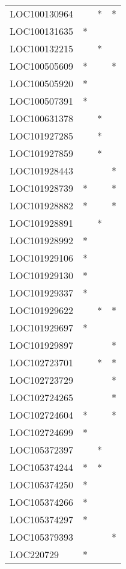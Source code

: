 \begin{longtable}{lccc}
LOC100130964     &       &  * &       * \\
LOC100131635     &     * &    &         \\
LOC100132215     &       &  * &         \\
LOC100505609     &     * &    &       * \\
LOC100505920     &     * &    &         \\
LOC100507391     &     * &    &         \\
LOC100631378     &       &  * &         \\
LOC101927285     &       &  * &         \\
LOC101927859     &       &  * &         \\
LOC101928443     &       &    &       * \\
LOC101928739     &     * &    &       * \\
LOC101928882     &     * &    &       * \\
LOC101928891     &       &  * &         \\
LOC101928992     &     * &    &         \\
LOC101929106     &     * &    &         \\
LOC101929130     &     * &    &         \\
LOC101929337     &     * &    &         \\
LOC101929622     &       &  * &       * \\
LOC101929697     &     * &    &         \\
LOC101929897     &       &    &       * \\
LOC102723701     &       &  * &       * \\
LOC102723729     &       &    &       * \\
LOC102724265     &       &    &       * \\
LOC102724604     &     * &    &       * \\
LOC102724699     &     * &    &         \\
LOC105372397     &       &  * &         \\
LOC105374244     &     * &  * &         \\
LOC105374250     &     * &    &         \\
LOC105374266     &     * &    &         \\
LOC105374297     &     * &    &         \\
LOC105379393     &       &    &       * \\
LOC220729        &     * &    &         \\

\end{longtable}
